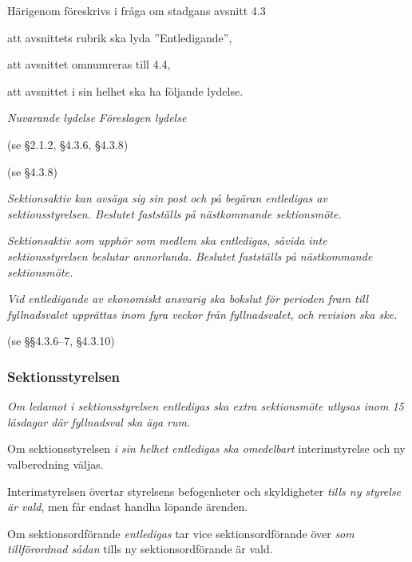 \documentclass{article}
\newenvironment{lydelse}
    {\begin{paracol}{2}%
        \emph{Nuvarande lydelse}%
        \switchcolumn%
        \emph{Föreslagen lydelse}%
    \end{paracol}%
    \begin{enumerate}[label=\thesubsection.\arabic*]%
    \begin{paracol}{2}%
    }{\end{paracol}\end{enumerate}}
\begin{document}
Härigenom föreskrivs i fråga om stadgans avsnitt 4.3
\begin{dels}
    \item att avsnittets rubrik ska lyda ''Entledigande'',
    \item att avsnittet omnumreras till 4.4,
    \item att avsnittet i sin helhet ska ha följande lydelse.
\end{dels}

\begin{lydelse}
  \item[] (se \S 2.1.2, \S 4.3.6, \S 4.3.8)
  \item[] (se \S 4.3.8)
  
\switchcolumn
  \setcounter{enumi}{0}
  \item \emph{Sektionsaktiv kan avsäga sig sin post och på begäran entledigas av sektionsstyrelsen.
      Beslutet fastställs på nästkommande sektionsmöte.}

  \item \emph{Sektionsaktiv som upphör som medlem ska entledigas, såvida inte sektionsstyrelsen beslutar annorlunda.
      Beslutet fastställs på nästkommande sektionsmöte.}
  \label{4.x:kvarstå}

  \item \emph{Vid entledigande av ekonomiskt ansvarig ska bokslut för perioden fram till fyllnadsvalet upprättas inom fyra veckor från fyllnadsvalet, och revision ska ske.}
    \label{4.2:enteko}

    \switchcolumn*
    \item[] (se \S\S 4.3.6--7, \S 4.3.10)
    \switchcolumn
    \subsubsection*{Sektionsstyrelsen}
    \item \emph{Om ledamot i sektionsstyrelsen entledigas ska extra sektionsmöte utlysas inom 15 läsdagar där fyllnadsval ska äga rum}.

    \item Om sektionsstyrelsen \emph{i sin helhet entledigas ska omedelbart} interimstyrelse och ny valberedning väljas.

    \item Interimstyrelsen övertar styrelsens befogenheter och skyldigheter \emph{tills ny styrelse är vald}, men får endast handha löpande ärenden.

    \item Om sektionsordförande \emph{entledigas} tar vice sektionsordförande över \emph{som tillförordnad sådan} tills ny sektionsordförande är vald.


\end{lydelse}
\end{document}
